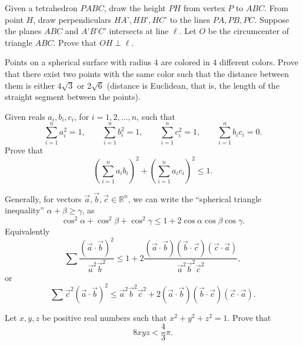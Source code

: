 \begin{question}[name={2017 St. Petersburg}]
	Given a tetrahedron $PABC$, draw the height $PH$ from vertex $P$ to $ABC$. From point $H$, draw perpendiculars $HA’,HB’,HC’$ to the lines $PA,PB,PC$. Suppose the planes $ABC$ and $A’B’C’$ intersects at line $\ell$. Let $O$ be the circumcenter of triangle $ABC$. Prove that $OH\perp \ell$.
\end{question}





\begin{question}[name={2018 Spain}]
	Points on a spherical surface with radius $4$ are colored in $4$ different colors. Prove that there exist two points with the same color such that the distance between them is either $4\sqrt{3}$ or $2\sqrt{6}$ (distance is Euclidean, that is, the length of the straight segment between the points).
\end{question}



\begin{question}
	Given reals $ a_i ,b_i,c_i$, for $ i=1,2,\dots,n$, such that \[\sum_{i=1}^n a_{i}^2=1, \qquad  \sum_{i=1}^n b_{i}^2=1, \qquad \sum_{i=1}^n c_{i}^2=1, \qquad \sum_{i=1}^n b_ic_i=0.\]
	Prove that $$\left(\sum_{i=1}^n a_ib_i\right)^2+\left(\sum_{i=1}^n a_ic_i\right)^2 \leq 1.$$
\end{question}



\begin{solution}[name={Solution by Spanferkel and Arqady}] 
	Generally, for vectors $ \vec a, \vec b, \vec c\in\mathbb R^n$, we can write the ``spherical triangle inequality'' $ \alpha + \beta\ge \gamma$, as
	\[ \cos^2\alpha + \cos^2\beta + \cos^2\gamma\le1 + 2\cos\alpha\cos\beta \cos\gamma.\]
	Equivalently
	\[ \sum\frac { (\vec a\cdot\vec b)^2}{\vec a^2\vec b^2}\le1 + 2\frac {(\vec a\cdot\vec b) (\vec b\cdot\vec c) (\vec c\cdot\vec a)}{\vec a^2\vec b^2\vec c^2},\]
	or
	\[ \sum { {\vec c^2}(\vec a\cdot\vec b)^2}\le \vec a^2\vec b^2\vec c^2 + 2(\vec a\cdot\vec b) (\vec b\cdot\vec c) (\vec c\cdot\vec a).\]
\end{solution}



\begin{question}[name={Spherical Inequality by Puuhikki}]
	Let $x,y,z$ be positive real numbers such that $x^{2}+y^{2}+z^{2}=1$. Prove that \[8xyz<\frac{4}{3}\pi.\]
\end{question}


